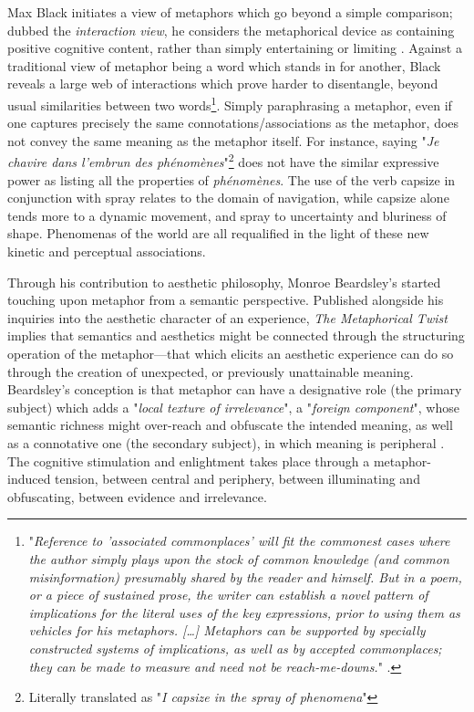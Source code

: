 Max Black initiates a view of metaphors which go beyond a simple comparison; dubbed the \emph{interaction view}, he considers the metaphorical device as containing positive cognitive content, rather than simply entertaining or limiting \citep{black_metaphor_1955}. Against a traditional view of metaphor being a word which stands in for another, Black reveals a large web of interactions which prove harder to disentangle, beyond usual similarities between two words\footnote{"\emph{Reference to 'associated commonplaces' will fit the commonest cases where the author simply plays upon the stock of common knowledge (and common misinformation) presumably shared by the reader and himself. But in a poem, or a piece of sustained prose, the writer can establish a novel pattern of implications for the literal uses of the key expressions, prior to using them as vehicles for his metaphors. [\dots] Metaphors can be supported by specially constructed systems of implications, as well as by accepted commonplaces; they can be made to measure and need not be reach-me-downs.}" \citep{black_metaphor_1955}.}. Simply paraphrasing a metaphor, even if one captures precisely the same connotations/associations as the metaphor, does not convey the same meaning as the metaphor itself. For instance, saying "\emph{Je chavire dans l'embrun des phénomènes}"\footnote{Literally translated as "\emph{I capsize in the spray of phenomena}"} \citep{beckett_molloy_1982} does not have the similar expressive power as listing all the properties of \emph{phénomènes}. The use of the verb capsize in conjunction with spray relates to the domain of navigation, while capsize alone tends more to a dynamic movement, and spray to uncertainty and bluriness of shape. Phenomenas of the world are all requalified in the light of these new kinetic and perceptual associations.

Through his contribution to aesthetic philosophy, Monroe Beardsley's started touching upon metaphor from a semantic perspective. Published alongside his inquiries into the aesthetic character of an experience, \emph{The Metaphorical Twist} implies that semantics and aesthetics might be connected through the structuring operation of the metaphor—that which elicits an aesthetic experience can do so through the creation of unexpected, or previously unattainable meaning. Beardsley's conception is that metaphor can have a designative role (the primary subject) which adds a "\emph{local texture of irrelevance}", a "\emph{foreign component}", whose semantic richness might over-reach and obfuscate the intended meaning, as well as a connotative one (the secondary subject), in which meaning is peripheral \citep{beardsley_metaphorical_1962}. The cognitive stimulation and enlightment takes place through a metaphor-induced tension, between central and periphery, between illuminating and obfuscating, between evidence and irrelevance.

